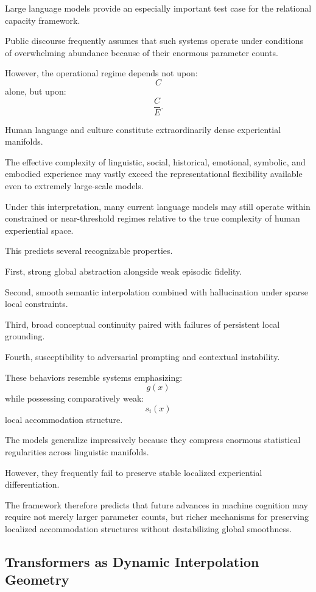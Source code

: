 \documentclass[12pt,a4paper]{article}
\begin{document}
Large language models provide an especially important test case for the relational capacity framework.

Public discourse frequently assumes that such systems operate under conditions of overwhelming abundance because of their enormous parameter counts.

However, the operational regime depends not upon:
\[
C
\]
alone,
but upon:
\[
\frac{C}{E}.
\]

Human language and culture constitute extraordinarily dense experiential manifolds.

The effective complexity of linguistic, social, historical, emotional, symbolic, and embodied experience may vastly exceed the representational flexibility available even to extremely large-scale models.

Under this interpretation, many current language models may still operate within constrained or near-threshold regimes relative to the true complexity of human experiential space.

This predicts several recognizable properties.

First, strong global abstraction alongside weak episodic fidelity.

Second, smooth semantic interpolation combined with hallucination under sparse local constraints.

Third, broad conceptual continuity paired with failures of persistent local grounding.

Fourth, susceptibility to adversarial prompting and contextual instability.

These behaviors resemble systems emphasizing:
\[
g(x)
\]
while possessing comparatively weak:
\[
s_i(x)
\]
local accommodation structure.

The models generalize impressively because they compress enormous statistical regularities across linguistic manifolds.

However, they frequently fail to preserve stable localized experiential differentiation.

The framework therefore predicts that future advances in machine cognition may require not merely larger parameter counts, but richer mechanisms for preserving localized accommodation structures without destabilizing global smoothness.

\subsection{Transformers as Dynamic Interpolation Geometry}
\end{document}
